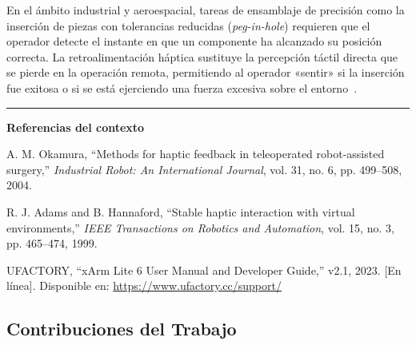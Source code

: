 \documentclass[journal,10pt,twoside]{IEEEtran}
\begin{document}
En el ámbito industrial y aeroespacial, tareas de ensamblaje de
precisión como la inserción de piezas con tolerancias reducidas
(\textit{peg-in-hole}) requieren que el operador detecte el instante
en que un componente ha alcanzado su posición correcta.
La retroalimentación háptica sustituye la percepción táctil directa
que se pierde en la operación remota, permitiendo al operador
«sentir» si la inserción fue exitosa o si se está ejerciendo una
fuerza excesiva sobre el entorno~\cite{siciliano2009}.

\medskip
\noindent\rule{\linewidth}{0.4pt}
\medskip

\textbf{Referencias del contexto}
\begin{enumerate}[label={[\arabic*]}]
  \item A. M. Okamura, ``Methods for haptic feedback in teleoperated robot-assisted surgery,'' \textit{Industrial Robot: An International Journal}, vol. 31, no. 6, pp. 499--508, 2004.
  \item R. J. Adams and B. Hannaford, ``Stable haptic interaction with virtual environments,'' \textit{IEEE Transactions on Robotics and Automation}, vol. 15, no. 3, pp. 465--474, 1999.
  \item UFACTORY, ``xArm Lite 6 User Manual and Developer Guide,'' v2.1, 2023. [En línea]. Disponible en: \url{https://www.ufactory.cc/support/}
\end{enumerate}

\subsection{Contribuciones del Trabajo}
\end{document}
